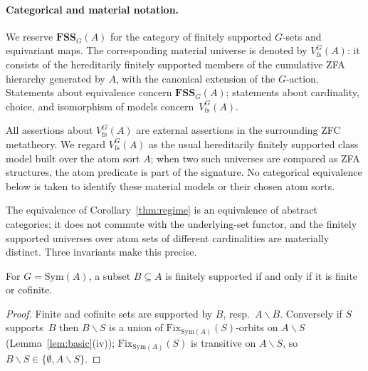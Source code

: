 \documentclass{lmcs}
\newcommand{\Sym}{\mathrm{Sym}}
\newcommand{\Fix}{\mathrm{Fix}}
\newcommand{\fs}{\mathrm{fs}}
\newcommand{\FSS}{\mathbf{FSS}}
\newcommand{\Vfs}{V_{\fs}}
\begin{document}
\paragraph{Categorical and material notation.}
We reserve $\FSS_G(A)$ for the category of finitely supported $G$-sets and equivariant maps. The corresponding material universe is denoted by $\Vfs^G(A)$: it consists of the hereditarily finitely supported members of the cumulative ZFA hierarchy generated by $A$, with the canonical extension of the $G$-action. Statements about equivalence concern $\FSS_G(A)$; statements about cardinality, choice, and isomorphism of models concern~$\Vfs^G(A)$.

All assertions about $\Vfs^G(A)$ are external assertions in the surrounding
ZFC metatheory. We regard $\Vfs^G(A)$ as the usual hereditarily finitely
supported class model built over the atom sort $A$; when two such universes
are compared as ZFA structures, the atom predicate is part of the signature.
No categorical equivalence below is taken to identify these material models
or their chosen atom sorts.

The equivalence of Corollary~\ref{thm:regime} is an equivalence of abstract categories; it does not commute with the underlying-set functor, and the finitely supported universes over atom sets of different cardinalities are materially distinct. Three invariants make this precise.

\begin{prop}\label{prop:fscofinite}
For $G=\Sym(A)$, a subset $B\subseteq A$ is finitely supported if and
only if it is finite or cofinite.
\end{prop}
\begin{proof}
Finite and cofinite sets are supported by $B$, resp.\ $A\smallsetminus B$. Conversely if $S$ supports~$B$ then $B\smallsetminus S$ is a union of $\Fix_{\Sym(A)}(S)$-orbits on $A\smallsetminus S$ (Lemma~\ref{lem:basic}(iv));
$\Fix_{\Sym(A)}(S)$ is transitive on $A\smallsetminus S$, so $B\smallsetminus
S\in\{\emptyset,A\smallsetminus S\}$.
\end{proof}
\end{document}
